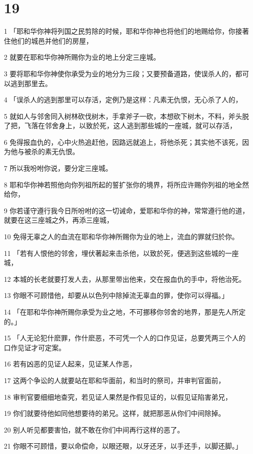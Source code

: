 \chapter{19}

\par 1 「耶和华你神将列国之民剪除的时候，耶和华你神也将他们的地赐给你，你接著住他们的城邑并他们的房屋，
\par 2 就要在耶和华你神所赐你为业的地上分定三座城。
\par 3 要将耶和华你神使你承受为业的地分为三段；又要预备道路，使误杀人的，都可以逃到那里去。
\par 4 「误杀人的逃到那里可以存活，定例乃是这样：凡素无仇恨，无心杀了人的，
\par 5 就如人与邻舍同入树林砍伐树木，手拿斧子一砍，本想砍下树木，不料，斧头脱了把，飞落在邻舍身上，以致於死，这人逃到那些城的一座城，就可以存活，
\par 6 免得报血仇的，心中火热追赶他，因路远就追上，将他杀死；其实他不该死，因为他与被杀的素无仇恨。
\par 7 所以我吩咐你说，要分定三座城。
\par 8 耶和华你神若照他向你列祖所起的誓扩张你的境界，将所应许赐你列祖的地全然给你，
\par 9 你若谨守遵行我今日所吩咐的这一切诫命，爱耶和华你的神，常常遵行他的道，就要在这三座城之外，再添三座城，
\par 10 免得无辜之人的血流在耶和华你神所赐你为业的地上，流血的罪就归於你。
\par 11 「若有人恨他的邻舍，埋伏著起来击杀他，以致於死，便逃到这些城的一座城，
\par 12 本城的长老就要打发人去，从那里带出他来，交在报血仇的手中，将他治死。
\par 13 你眼不可顾惜他，却要从以色列中除掉流无辜血的罪，使你可以得福。」
\par 14 「在耶和华你神所赐你承受为业之地，不可挪移你邻舍的地界，那是先人所定的。」
\par 15 「人无论犯什麽罪，作什麽恶，不可凭一个人的口作见证，总要凭两三个人的口作见证才可定案。
\par 16 若有凶恶的见证人起来，见证某人作恶，
\par 17 这两个争讼的人就要站在耶和华面前，和当时的祭司，并审判官面前，
\par 18 审判官要细细地查究，若见证人果然是作假见证的，以假见证陷害弟兄，
\par 19 你们就要待他如同他想要待的弟兄。这样，就把那恶从你们中间除掉。
\par 20 别人听见都要害怕，就不敢在你们中间再行这样的恶了。
\par 21 你眼不可顾惜，要以命偿命，以眼还眼，以牙还牙，以手还手，以脚还脚。」

